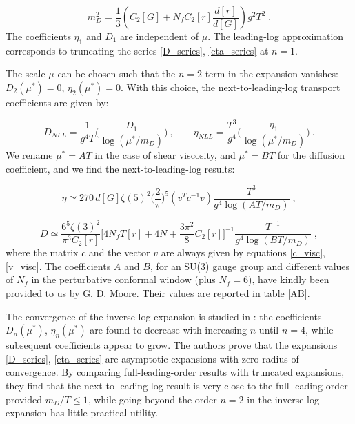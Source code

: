 \begin{equation}
 m_D^2 =  \frac{1}{3} \left(C_2[G] + N_f C_2[r]\frac{d[r]}{d[G]}  \right)g^2 T^2 \; .
\label{Debye_mass} 
\end{equation}
%
The coefficients $\eta_1$ and $D_1$ are independent of $\mu$. The leading-log approximation corresponds to truncating the series \ref{D_series}, \ref{eta_series} at $n=1$.

The scale $\mu$ can be chosen such that the $n=2$ term in the expansion vanishes: $D_2(\mu^*) = 0$, $\eta_2(\mu^*) =0$. With this choice, the next-to-leading-log transport coefficients are given by:

\begin{equation}
D_{NLL} = \frac{1}{g^4 T} \biggl( \frac{D_1}{ \log(\mu^*/m_D)} \biggr) \: , \qquad
\eta_{NLL} = \frac{T^3}{g^4} \biggl( \frac{\eta_1}{ \log(\mu^*/m_D)} \biggr) \: .
\end{equation} 
%
We rename $\mu^* = AT$ in the case of shear viscosity, and $\mu^* = BT$ for the diffusion coefficient, and we find the next-to-leading-log results:

 \begin{equation}   
\eta \simeq 270 \, d [G] \zeta(5)^2 \biggl( \frac{2}{\pi} \biggr)^5 (v^T c^{-1} v) \frac{T^3}{g^4 \log( AT/m_D)} \; ,
\label{eta_NLL}
\end{equation}

\begin{equation}
D \simeq \frac{6^5 \zeta(3)^2}{\pi^3 C_2[r]} \biggl[ 4 N_f T[r] + 4 N + \frac{3 \pi^2}{8} C_2[r] \biggr]^{-1} 
 \frac{T^{-1}}{g^4\log(BT/m_D)} \; ,
 \label{D_NLL}
\end{equation}
%
where the matrix $c$ and the vector $v$ are always given by equations \ref{c_visc}, \ref{v_visc}. The coefficients $A$ and $B$, for an SU(3) gauge group and different values of $N_f$ in the perturbative conformal window (plus $N_f = 6$), have kindly been provided to us by G. D. Moore. Their values are reported in table \ref{AB}.

The convergence of the inverse-log expansion is studied in \cite{Arnold:2003zc}: the coefficients $D_n(\mu^*)$, $\eta_n(\mu^*)$ are found to decrease with increasing $n$ until $n=4$, while subsequent coefficients appear to grow. The authors prove that the expansions \ref{D_series}, \ref{eta_series} are asymptotic expansions with zero radius of convergence. By comparing full-leading-order results with truncated expansions, they find that the next-to-leading-log result is very close to the full leading order provided $m_D/T \leq 1$, while going beyond the order $n=2$ in the inverse-log expansion has little practical utility.

